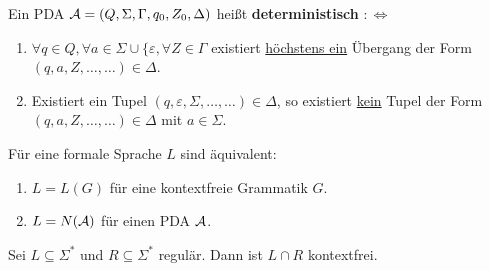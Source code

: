 \begin{definition}\label{def10.5}
	Ein PDA $\mathcal{A}=(Q,\Sigma,\Gamma,q_0,Z_0,\Delta)$ heißt \textbf{deterministisch} $:\Longleftrightarrow$
	\begin{enumerate}
		\item $\forall q\in Q,\forall a\in\Sigma\cup\lbrace\varepsilon,\forall Z\in\Gamma$ existiert \underline{höchstens ein} Übergang der Form\\ $(q,a,Z,\ldots,\ldots)\in\Delta$.
		\item Existiert ein Tupel $(q,\varepsilon,\Sigma,\ldots,\ldots)\in\Delta$, so existiert \underline{kein} Tupel der Form\\ $(q,a,Z,\ldots,\ldots)\in\Delta$ mit $a\in\Sigma$.
	\end{enumerate}
\end{definition}

\begin{satz}\label{satz10.8}
	Für eine formale Sprache $L$ sind äquivalent:
	\begin{enumerate}
		\item $L=L(G)$ für eine kontextfreie Grammatik $G$.
		\item $L=N(\mathcal{A})$ für einen PDA $\mathcal{A}$.
	\end{enumerate}
\end{satz}

\begin{korollar}\label{korollar10.9}
	Sei $L\subseteq\Sigma^\ast$ und $R\subseteq\Sigma^\ast$ regulär.
	Dann ist $L\cap R$ kontextfrei.
\end{korollar}

